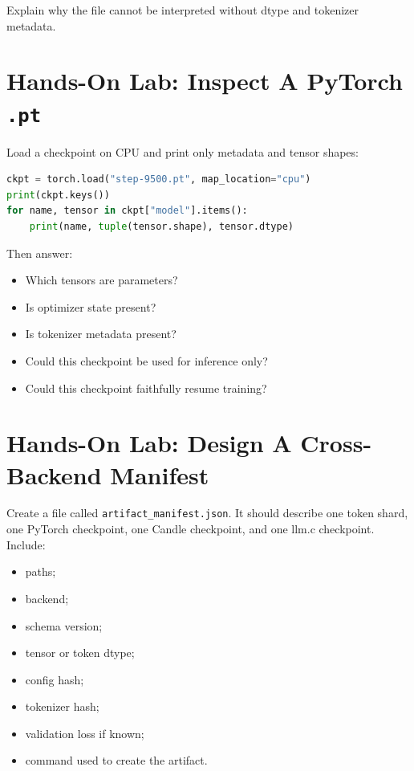 Explain why the file cannot be interpreted without dtype and tokenizer metadata.

\section{Hands-On Lab: Inspect A PyTorch \texttt{.pt}}

Load a checkpoint on CPU and print only metadata and tensor shapes:

\begin{lstlisting}[language=Python]
ckpt = torch.load("step-9500.pt", map_location="cpu")
print(ckpt.keys())
for name, tensor in ckpt["model"].items():
    print(name, tuple(tensor.shape), tensor.dtype)
\end{lstlisting}

Then answer:

\begin{itemize}
  \item Which tensors are parameters?
  \item Is optimizer state present?
  \item Is tokenizer metadata present?
  \item Could this checkpoint be used for inference only?
  \item Could this checkpoint faithfully resume training?
\end{itemize}

\section{Hands-On Lab: Design A Cross-Backend Manifest}

Create a file called \texttt{artifact\_manifest.json}. It should describe one token shard,
one PyTorch checkpoint, one Candle checkpoint, and one llm.c checkpoint. Include:

\begin{itemize}
  \item paths;
  \item backend;
  \item schema version;
  \item tensor or token dtype;
  \item config hash;
  \item tokenizer hash;
  \item validation loss if known;
  \item command used to create the artifact.
\end{itemize}


